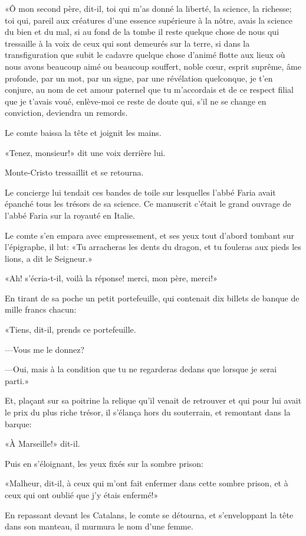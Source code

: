 «Ô mon second père, dit-il, toi qui m'as donné la liberté, la science, la richesse; toi qui, pareil aux créatures d'une essence supérieure à la nôtre, avais la science du bien et du mal, si au fond de la tombe il reste quelque chose de nous qui tressaille à la voix de ceux qui sont demeurés sur la terre, si dans la transfiguration que subit le cadavre quelque chose d'animé flotte aux lieux où nous avons beaucoup aimé ou beaucoup souffert, noble cœur, esprit suprême, âme profonde, par un mot, par un signe, par une révélation quelconque, je t'en conjure, au nom de cet amour paternel que tu m'accordais et de ce respect filial que je t'avais voué, enlève-moi ce reste de doute qui, s'il ne se change en conviction, deviendra un remords. 

Le comte baissa la tête et joignit les mains. 

«Tenez, monsieur!» dit une voix derrière lui. 

Monte-Cristo tressaillit et se retourna. 

Le concierge lui tendait ces bandes de toile sur lesquelles l'abbé Faria avait épanché tous les trésors de sa science. Ce manuscrit c'était le grand ouvrage de l'abbé Faria sur la royauté en Italie. 

Le comte s'en empara avec empressement, et ses yeux tout d'abord tombant sur l'épigraphe, il lut: «Tu arracheras les dents du dragon, et tu fouleras aux pieds les lions, a dit le Seigneur.» 

«Ah! s'écria-t-il, voilà la réponse! merci, mon père, merci!» 

En tirant de sa poche un petit portefeuille, qui contenait dix billets de banque de mille francs chacun: 

«Tiens, dit-il, prends ce portefeuille. 

—Vous me le donnez? 

—Oui, mais à la condition que tu ne regarderas dedans que lorsque je serai parti.» 

Et, plaçant sur sa poitrine la relique qu'il venait de retrouver et qui pour lui avait le prix du plus riche trésor, il s'élança hors du souterrain, et remontant dans la barque: 

«À Marseille!» dit-il. 

Puis en s'éloignant, les yeux fixés sur la sombre prison: 

«Malheur, dit-il, à ceux qui m'ont fait enfermer dans cette sombre prison, et à ceux qui ont oublié que j'y étais enfermé!» 

En repassant devant les Catalans, le comte se détourna, et s'enveloppant la tête dans son manteau, il murmura le nom d'une femme. 

